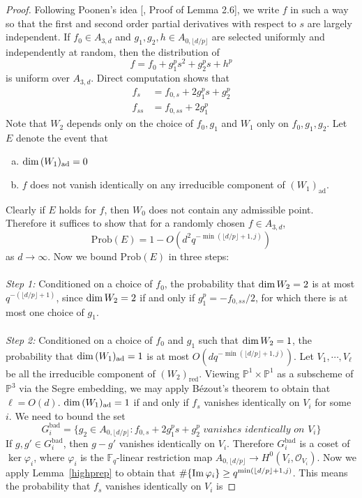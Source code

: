 \documentclass[12pt]{article}
\theoremstyle{plain}
\theoremstyle{definition}
\newcommand{\IF}{\mathbb{F}}
\newcommand{\IP}{\mathbb{P}}
\newcommand{\sO}{\mathcal{O}}
\renewcommand\dim{{\rm dim\,}}
\newcommand{\im}{{\rm Im\,}}
\newcommand{\<}{\langle}
\renewcommand{\>}{\rangle}
\newcommand{\Prob}{\mathrm{Prob}}
\newcommand{\ad}{\mathrm{ad}}
\begin{document}
\begin{proof}
Following Poonen's idea [\cite{Poonen}, Proof of Lemma 2.6], we write $f$ in such a way so that the first and second order partial derivatives with respect to $s$ are largely independent. If $f_0 \in A_{3, d}$ and $g_1, g_2, h \in A_{0, \lfloor d/p \rfloor}$ are selected uniformly and independently at random, then the distribution of 
$$ f = f_0 + g_1^p s^2 + g_2^p s + h^p $$
is uniform over $A_{3, d}$. 
Direct computation shows that 
\begin{align*}
f_s &= f_{0, s} + 2 g_1^p s + g_2^p\\
f_{ss} &= f_{0, ss} + 2 g_1^p 
\end{align*} 
Note that $W_2$ depends only on the choice of $f_0, g_1$ and $W_1$ only on $f_0, g_1, g_2$.  Let $E$ denote the event that 
\begin{enumerate}[a.]
\item $\dim (W_1)_{\ad} = 0$  
\item $f$ does not vanish identically on any irreducible component of $(W_1)_{\ad}$. 
\end{enumerate} 
Clearly if $E$ holds for $f$, then $W_0$ does not contain any admissible point. Therefore it suffices to show that for a randomly chosen $f \in A_{3, d}$, 
$$ \Prob(E) = 1 - O(d^2 q^{- \min(\lfloor d/p \rfloor + 1, j)})  $$
as $d \to \infty$. Now we bound $\Prob(E)$ in three steps: \\\\
\textit{Step 1: }Conditioned on a choice of $f_0$, the probability that $\dim W_2 = 2$ is at most $q^{- (\lfloor d/p \rfloor + 1)}$, since $\dim W_2 = 2$ if and only if $g_1^p = - f_{0, ss}/2$, for which there is at most one choice of $g_1$. \\\\
\textit{Step 2: }Conditioned on a choice of $f_0$ and $g_1$ such that $\dim W_2 = 1$, the probability that $\dim (W_1)_{\mathrm{ad}} = 1$ is at most $O(d q^{- \min(\lfloor d/p \rfloor + 1, j)})$. Let $V_1, \cdots, V_\ell$ be all the irreducible component of $(W_2)_{\mathrm{red}}$. Viewing $\IP^1 \times \IP^1$ as a subscheme of $\IP^3$ via the Segre embedding, we may apply B{\'e}zout's theorem to obtain that $\ell = O(d)$. $\dim (W_1)_{\ad} = 1$ if and only if $f_s$ vanishes identically on $V_i$ for some $i$. We need to bound the set
$$ G^{\mathrm{bad}}_i = \{ g_2 \in A_{0, \lfloor d/p \rfloor} : f_{0, s} + 2 g_1^p s + g_2^p \textit{ vanishes identically on }V_i \} $$
If $g, g' \in G^{\mathrm{bad}}_i$, then $g - g'$ vanishes identically on $V_i$. Therefore $G^{\mathrm{bad}}_i$ is a coset of $\ker \varphi_i$, where $\varphi_i$ is the $\IF_q$-linear restriction map $A_{0, \lfloor d/p \rfloor} \to H^0(V_i, \sO_{V_i})$. Now we apply Lemma~\ref{highprep} to obtain that $\# \{ \im \varphi_i \} \ge q^{\min(\lfloor d/p \rfloor + 1, j)}$. This means the probability that $f_s$ vanishes identically on $V_i$ is

\end{proof}
\end{document}
